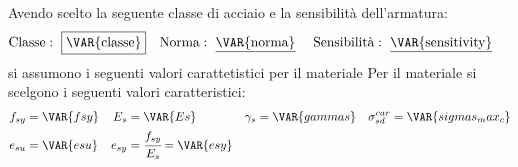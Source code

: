 Avendo scelto la seguente classe di acciaio e la sensibilità dell'armatura:
\begin{align*}
\text{Classe} &: \text{ \fbox{\VAR{classe}}} & \text{Norma} &: \text{ \underline{\VAR{norma}} } & \text{Sensibilità} &: \text{ \underline{\VAR{sensitivity}} }
\end{align*}
si assumono i seguenti valori carattetistici per il materiale
Per il materiale si scelgono i seguenti valori caratteristici:
\begin{align*}
    f_{sy} &= \VAR{fsy} &   E_{s} &= \VAR{Es} & \gamma_s &= \VAR{gammas} & \sigma^{car}_{sd} &= \VAR{sigmas_max_c}  \\
    e_{su} &= \VAR{esu} &  e_{sy} &= \cfrac{f_{sy}}{E_{s}} = \VAR{esy}
\end{align*}
